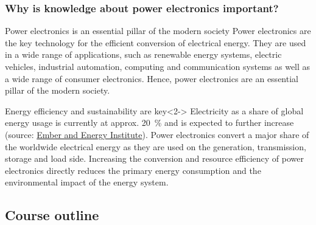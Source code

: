 \begin{frame}
	\frametitle{Why is knowledge about power electronics important?}
	\begin{varblock}{Power electronics is an essential pillar of the modern society}
		Power electronics are the key technology for the efficient conversion of electrical energy. They are used in a wide range of applications, such as renewable energy systems, electric vehicles, industrial automation, computing and communication systems as well as a wide range of consumer electronics. Hence, power electronics are an essential pillar of the modern society.
	\end{varblock}
	\begin{varblock}{Energy efficiency and sustainability are key}<2->
		Electricity as a share of global energy usage is currently at approx. \SI{20}{\percent} and is expected to further increase (source: \href{https://ourworldindata.org/grapher/electricity-as-a-share-of-primary-energy}{Ember and Energy Institute}). Power electronics convert a major share of the worldwide electrical energy as they are used on the generation, transmission, storage and load side. Increasing the conversion and resource efficiency of power electronics directly reduces the primary energy consumption and the environmental impact of the energy system.
	\end{varblock}
\end{frame}

\subsection{Course outline}

